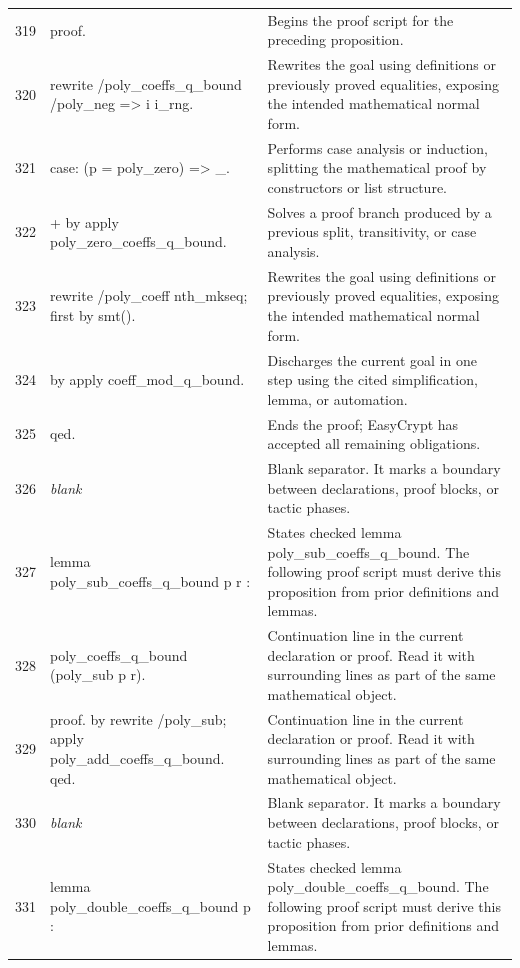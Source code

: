 \documentclass[10pt]{article}
\begin{document}
\begin{longtable}{r L{0.53\textwidth} L{0.37\textwidth}}
319 & {\ttfamily\scriptsize proof.} & Begins the proof script for the preceding proposition. \\
320 & {\ttfamily\scriptsize rewrite /poly\_coeffs\_q\_bound /poly\_neg => i i\_rng.} & Rewrites the goal using definitions or previously proved equalities, exposing the intended mathematical normal form. \\
321 & {\ttfamily\scriptsize case: (p = poly\_zero) => \_.} & Performs case analysis or induction, splitting the mathematical proof by constructors or list structure. \\
322 & {\ttfamily\scriptsize + by apply poly\_zero\_coeffs\_q\_bound.} & Solves a proof branch produced by a previous split, transitivity, or case analysis. \\
323 & {\ttfamily\scriptsize rewrite /poly\_coeff nth\_mkseq; first by smt().} & Rewrites the goal using definitions or previously proved equalities, exposing the intended mathematical normal form. \\
324 & {\ttfamily\scriptsize by apply coeff\_mod\_q\_bound.} & Discharges the current goal in one step using the cited simplification, lemma, or automation. \\
325 & {\ttfamily\scriptsize qed.} & Ends the proof; EasyCrypt has accepted all remaining obligations. \\
326 & {\ttfamily\scriptsize \emph{blank}} & Blank separator.  It marks a boundary between declarations, proof blocks, or tactic phases. \\
327 & {\ttfamily\scriptsize lemma poly\_sub\_coeffs\_q\_bound p r :} & States checked lemma poly\_sub\_coeffs\_q\_bound.  The following proof script must derive this proposition from prior definitions and lemmas. \\
328 & {\ttfamily\scriptsize   poly\_coeffs\_q\_bound (poly\_sub p r).} & Continuation line in the current declaration or proof.  Read it with surrounding lines as part of the same mathematical object. \\
329 & {\ttfamily\scriptsize proof. by rewrite /poly\_sub; apply poly\_add\_coeffs\_q\_bound. qed.} & Continuation line in the current declaration or proof.  Read it with surrounding lines as part of the same mathematical object. \\
330 & {\ttfamily\scriptsize \emph{blank}} & Blank separator.  It marks a boundary between declarations, proof blocks, or tactic phases. \\
331 & {\ttfamily\scriptsize lemma poly\_double\_coeffs\_q\_bound p :} & States checked lemma poly\_double\_coeffs\_q\_bound.  The following proof script must derive this proposition from prior definitions and lemmas. \\

\end{longtable}
\end{document}
